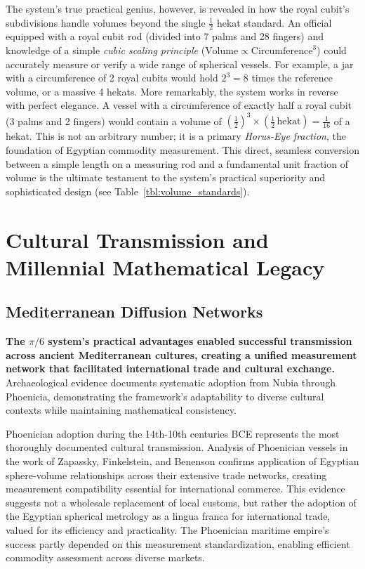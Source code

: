 \documentclass[11pt]{article}
\begin{document}
The system's true practical genius, however, is revealed in how the royal cubit's subdivisions handle volumes beyond the single $\frac{1}{2}$ hekat standard. An official equipped with a royal cubit rod (divided into 7 palms and 28 fingers) and knowledge of a simple \textit{cubic scaling principle} ($\text{Volume} \propto \text{Circumference}^3$) could accurately measure or verify a wide range of spherical vessels. For example, a jar with a circumference of 2 royal cubits would hold $2^3 = 8$ times the reference volume, or a massive 4 hekats. More remarkably, the system works in reverse with perfect elegance. A vessel with a circumference of exactly half a royal cubit (3 palms and 2 fingers) would contain a volume of $(\frac{1}{2})^3 \times (\frac{1}{2}\,\text{hekat}) = \frac{1}{16}$ of a hekat. This is not an arbitrary number; it is a primary \textit{Horus-Eye fraction}, the foundation of Egyptian commodity measurement. This direct, seamless conversion between a simple length on a measuring rod and a fundamental unit fraction of volume is the ultimate testament to the system's practical superiority and sophisticated design (see Table~\ref{tbl:volume_standards}).

\section{Cultural Transmission and Millennial Mathematical Legacy}

\subsection{Mediterranean Diffusion Networks}

\textbf{The $\pi/6$ system's practical advantages enabled successful transmission across ancient Mediterranean cultures, creating a unified measurement network that facilitated international trade and cultural exchange.} Archaeological evidence documents systematic adoption from Nubia through Phoenicia, demonstrating the framework's adaptability to diverse cultural contexts while maintaining mathematical consistency.

Phoenician adoption during the 14th-10th centuries BCE represents the most thoroughly documented cultural transmission. Analysis of Phoenician vessels in the work of Zapassky, Finkelstein, and Benenson \cite{zapassky2012ancient} confirms application of Egyptian sphere-volume relationships across their extensive trade networks, creating measurement compatibility essential for international commerce. This evidence suggests not a wholesale replacement of local customs, but rather the adoption of the Egyptian spherical metrology as a lingua franca for international trade, valued for its efficiency and practicality. The Phoenician maritime empire's success partly depended on this measurement standardization, enabling efficient commodity assessment across diverse markets.
\end{document}
